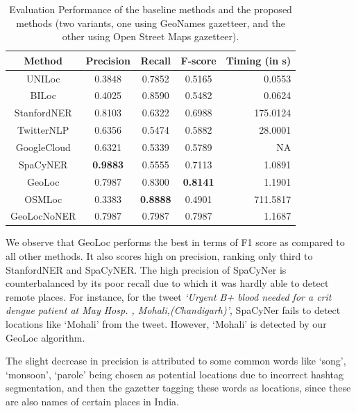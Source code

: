 \begin{table}[tb]
	\centering
		\begin{tabular}{|c|c|c|c|r|}
			\hline
			Method&	Precision&	Recall&	F-score&	Timing (in s)\\
			\hline
			UNILoc&	0.3848&	0.7852&	0.5165&	0.0553\\
			BILoc&	0.4025&	0.8590&	0.5482&	0.0624\\
			StanfordNER& 0.8103&	0.6322&	0.6988&	175.0124\\
			TwitterNLP&	0.6356&	0.5474&	0.5882&	28.0001\\
			GoogleCloud &	0.6321&	0.5339&	0.5789&	NA\\
            SpaCyNER & \textbf{0.9883}& 0.5555&0.7113 &1.0891\\
            \hline
			GeoLoc &	0.7987&	0.8300&\textbf{0.8141}&	1.1901\\
			OSMLoc & 0.3383& \textbf{0.8888}&0.4901 &711.5817\\
            GeoLocNoNER& 0.7987&	0.7987&0.7987&	1.1687\\

			\hline
			
			\hline
		\end{tabular}
		\caption{Evaluation Performance of the baseline methods and the proposed methods (two variants, one using GeoNames gazetteer, and the other using Open Street Maps gazetteer).}
		\label{tab:Evaluation table}
        \vspace*{-5mm}
\end{table}


We observe that GeoLoc performs the best in terms of F1 score as compared to all other methods. It also scores high on precision, ranking only third to StanfordNER and SpaCyNER. The high precision of SpaCyNer is counterbalanced by its poor recall due to which it was hardly able to detect remote places.
For instance, for the tweet {\it `Urgent B+ blood needed for a crit dengue patient at May Hosp. , Mohali,(Chandigarh)'}, SpaCyNer fails to detect locations like `Mohali' from the tweet.  
However, `Mohali' is detected by our GeoLoc algorithm.

The slight decrease in precision is attributed to some common words like `song', `monsoon', `parole' being chosen as potential locations due to incorrect hashtag segmentation, and then the gazetter tagging these words as locations, since these are also names of certain places in India. 

